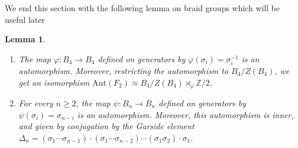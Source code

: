 \documentclass[letterpaper]{amsart}
\newtheorem{lemma}[theorem]{Lemma}
\begin{document}
We end this section with the following lemma on braid groups which will be useful later
\begin{lemma}
\label{semi-direct product AutF2}
\begin{enumerate}
\item The map $\varphi: B_4 \to B_4$ defined on generators by $\varphi(\sigma_i) = \sigma_i^{-1}$ is an automorphism. Moreover, restricting the automorphism to $B_4/Z(B_4)$, we get an isomorphism $\mathrm{Aut}(F_2) \simeq B_4/Z(B_4) \rtimes_\varphi \mathbb{Z}/2$.
\item For every $n \geq 2$, the map $\psi: B_n \to B_n$ defined on generators by $\psi(\sigma_i) = \sigma_{n-i}$ is an automorphism. Moreover, this automorphism is inner, and given by conjugation by the Garside element $\Delta_n = (\sigma_1 \cdots \sigma_{n-1}) \cdot (\sigma_1 \cdots \sigma_{n-2}) \cdots (\sigma_1\sigma_2) \cdot \sigma_1.$
\end{enumerate}
\end{lemma}
\end{document}
